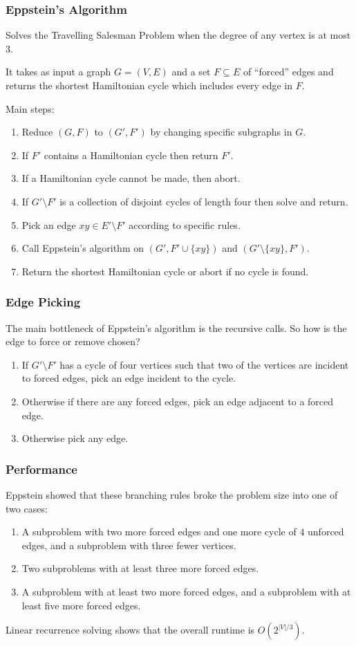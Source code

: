 \documentclass[]{beamer}
\begin{document}
\begin{frame}
\frametitle{Eppstein's Algorithm}
Solves the Travelling Salesman Problem when the degree of any vertex is at most $3$.

It takes as input a graph $G = (V, E)$ and a set $F \subseteq E$ of ``forced'' edges and returns the shortest Hamiltonian cycle which includes every edge in $F$.

Main steps:
\begin{enumerate}
\item Reduce $(G, F)$ to $(G', F')$ by changing specific subgraphs in $G$.
\item If $F'$ contains a Hamiltonian cycle then return $F'$.
\item If a Hamiltonian cycle cannot be made, then abort.
\item If $G' \setminus F'$ is a collection of disjoint cycles of length four then solve and return.
\item Pick an edge $xy \in E' \setminus F'$ according to specific rules.
\item Call Eppstein's algorithm on $(G', F' \cup \{xy\})$ and $(G' \setminus \{xy\}, F')$.
\item Return the shortest Hamiltonian cycle or abort if no cycle is found.
\end{enumerate}
\end{frame}

\begin{frame}
\frametitle{Edge Picking}
The main bottleneck of Eppstein's algorithm is the recursive calls. So how is the edge to force or remove chosen?

\begin{enumerate}
\item If $G' \setminus F'$ has a cycle of four vertices such that two of the vertices are incident to forced edges, pick an edge incident to the cycle.
\item Otherwise if there are any forced edges, pick an edge adjacent to a forced edge.
\item Otherwise pick any edge.
\end{enumerate}

\end{frame}

\begin{frame}
\frametitle{Performance}
Eppstein showed that these branching rules broke the problem size into one of two cases:

\begin{enumerate}
\item A subproblem with two more forced edges and one more cycle of $4$ unforced edges, and a subproblem with three fewer vertices.
\item Two subproblems with at least three more forced edges.
\item A subproblem with at least two more forced edges, and a subproblem with at least five more forced edges.
\end{enumerate}

Linear recurrence solving shows that the overall runtime is $O(2^{|V|/3})$.
\end{frame}
\end{document}
